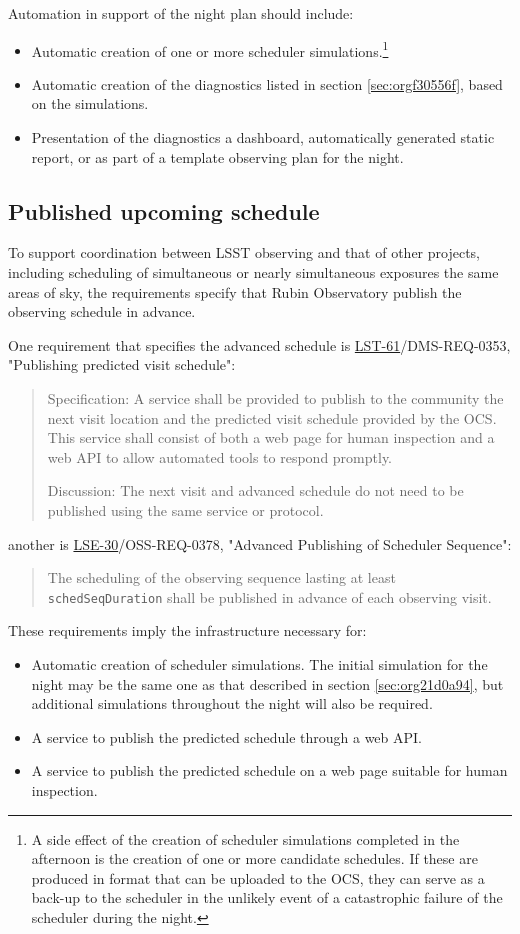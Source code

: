 Automation in support of the night plan should include:
\begin{itemize}
\item Automatic creation of one or more scheduler simulations.\footnote{A side effect of the creation of scheduler simulations completed in the afternoon is the creation of one or more candidate schedules. If these are produced in format that can be uploaded to the OCS, they can serve as a back-up to the scheduler in the unlikely event of a catastrophic failure of the scheduler during the night.}
\item Automatic creation of the diagnostics listed in section \ref{sec:orgf30556f}, based on the simulations.
\item Presentation of the diagnostics a dashboard, automatically generated static report, or as part of a template observing plan for the night.
\end{itemize}

\subsection{Published upcoming schedule}
\label{sec:orgef09541}
To support coordination between LSST observing and that of other projects, including scheduling of simultaneous or nearly simultaneous exposures the same areas of sky, the requirements specify that Rubin Observatory publish the observing schedule in advance.

One requirement that specifies the advanced schedule is \href{https://ls.st/lse-61}{LST-61}/DMS-REQ-0353, "Publishing predicted visit schedule":
\begin{quote}
Specification: A service shall be provided to publish to the community the next visit location and the predicted visit schedule provided by the OCS. This service shall consist of both a web page for human inspection and a web API to allow automated tools to respond promptly.

Discussion: The next visit and advanced schedule do not need to be published using the same service or protocol.
\end{quote}
another is \href{https://ls.st/lse-30}{LSE-30}/OSS-REQ-0378, "Advanced Publishing of Scheduler Sequence":
\begin{quote}
The scheduling of the observing sequence lasting at least \texttt{schedSeqDuration} shall be published in advance of each observing visit.
\end{quote}

These requirements imply the infrastructure necessary for:
\begin{itemize}
\item Automatic creation of scheduler simulations. The initial simulation for the night may be the same one as that described in section \ref{sec:org21d0a94}, but additional simulations throughout the night will also be required.
\item A service to publish the predicted schedule through a web API.
\item A service to publish the predicted schedule on a web page suitable for human inspection.
\end{itemize}

